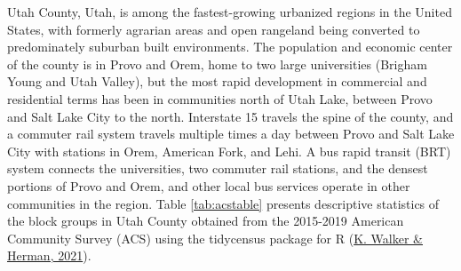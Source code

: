 \documentclass[review, 3p]{elsarticle} %
\begin{document}
Utah County, Utah, is among the fastest-growing urbanized regions in the United
States, with formerly agrarian areas and open rangeland being converted to
predominately suburban built environments. The population and economic center of
the county is in Provo and Orem, home to two large universities (Brigham Young
and Utah Valley), but the most rapid development in commercial and residential
terms has been in communities north of Utah Lake, between Provo and Salt Lake
City to the north. Interstate 15 travels the spine of the county, and a commuter
rail system travels multiple times a day between Provo and Salt Lake City with
stations in Orem, American Fork, and Lehi. A bus rapid transit (BRT) system connects
the universities, two commuter rail stations, and the densest portions of Provo
and Orem, and other local bus services operate in other communities in the region.
Table \ref{tab:acstable} presents descriptive statistics of
the block groups in Utah County obtained from the 2015-2019 American Community
Survey (ACS) using the tidycensus package for R (\protect\hyperlink{ref-tidycensus}{K. Walker \& Herman, 2021}).

\begin{table}

\caption{\label{tab:acstable}Block Group Summary Statistics}
\centering
{}
\end{table}
\end{document}
